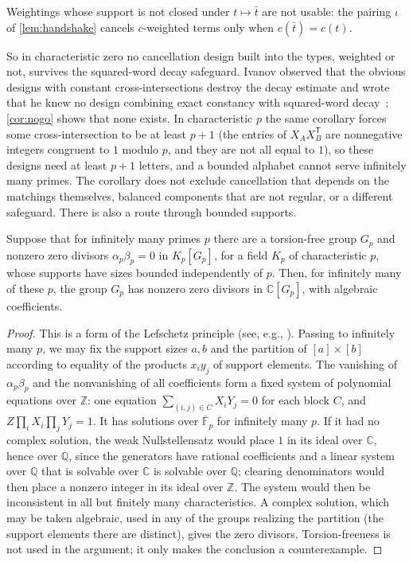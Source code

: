 \documentclass[11pt]{article}
\theoremstyle{definition}
\theoremstyle{plain}
\newcommand{\F}{\mathbb{F}}
\newcommand{\Z}{\mathbb{Z}}
\newcommand{\C}{\mathbb{C}}
\newcommand{\Q}{\mathbb{Q}}
\begin{document}
Weightings whose support is not closed under $t\mapsto\bar t$ are not usable: the pairing $\iota$ of \cref{lem:handshake} cancels $c$-weighted terms only when $c(\bar t)=c(t)$.

So in characteristic zero no cancellation design built into the types, weighted or not, survives the squared-word decay safeguard. Ivanov observed that the obvious designs with constant cross-intersections destroy the decay estimate and wrote that he knew no design combining exact constancy with squared-word decay~\cite[\S8.2]{Ivanov2026}; \cref{cor:nogo} shows that none exists. In characteristic $p$ the same corollary forces some cross-intersection to be at least $p+1$ (the entries of $X_AX_B^{\mathsf T}$ are nonnegative integers congruent to $1$ modulo $p$, and they are not all equal to $1$), so these designs need at least $p+1$ letters, and a bounded alphabet cannot serve infinitely many primes. The corollary does not exclude cancellation that depends on the matchings themselves, balanced components that are not regular, or a different safeguard. There is also a route through bounded supports.

\begin{proposition}\label{prop:lefschetz}
Suppose that for infinitely many primes $p$ there are a torsion-free group $G_p$ and nonzero zero divisors $\alpha_p\beta_p=0$ in $K_p[G_p]$, for a field $K_p$ of characteristic $p$, whose supports have sizes bounded independently of $p$. Then, for infinitely many of these $p$, the group $G_p$ has nonzero zero divisors in $\C[G_p]$, with algebraic coefficients.
\end{proposition}

\begin{proof}
This is a form of the Lefschetz principle (see, e.g., \cite[Corollary~2.2.10]{Marker2002}). Passing to infinitely many $p$, we may fix the support sizes $a,b$ and the partition of $[a]\times[b]$ according to equality of the products $x_iy_j$ of support elements. The vanishing of $\alpha_p\beta_p$ and the nonvanishing of all coefficients form a fixed system of polynomial equations over $\Z$: one equation $\sum_{(i,j)\in C}X_iY_j=0$ for each block $C$, and $Z\prod_iX_i\prod_jY_j=1$. It has solutions over $\overline{\F}_p$ for infinitely many $p$. If it had no complex solution, the weak Nullstellensatz would place $1$ in its ideal over $\C$, hence over $\Q$, since the generators have rational coefficients and a linear system over $\Q$ that is solvable over $\C$ is solvable over $\Q$; clearing denominators would then place a nonzero integer in its ideal over $\Z$. The system would then be inconsistent in all but finitely many characteristics. A complex solution, which may be taken algebraic, used in any of the groups realizing the partition (the support elements there are distinct), gives the zero divisors. Torsion-freeness is not used in the argument; it only makes the conclusion a counterexample.
\end{proof}
\end{document}
